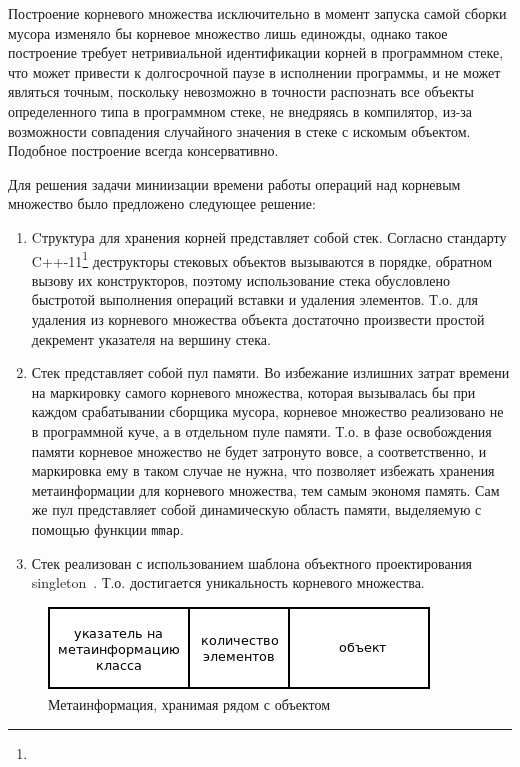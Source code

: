 Построение корневого множества исключительно в момент запуска самой сборки мусора
изменяло бы корневое множество лишь единожды, однако такое построение требует нетривиальной идентификации корней
в программном стеке, что может привести к долгосрочной паузе в исполнении программы, и не может являться
точным, поскольку невозможно в точности распознать все объекты определенного типа в программном стеке, не
внедряясь в компилятор, из-за возможности совпадения случайного значения в стеке с искомым объектом. Подобное
построение всегда консервативно.

Для решения задачи миниизации времени работы операций над корневым множество было предложено следующее решение:
\begin{enumerate}
\item Cтруктура для хранения корней представляет собой стек.
Согласно стандарту C++-11\footnote{} деструкторы стековых объектов вызываются в порядке, обратном вызову
их конструкторов, поэтому использование стека обусловлено быстротой выполнения операций вставки и удаления элементов.
Т.о. для удаления из корневого множества объекта достаточно произвести простой декремент указателя на вершину стека.
\item Стек представляет собой пул памяти.
Во избежание излишних затрат времени на маркировку самого корневого множества, которая вызывалась бы при каждом срабатывании
сборщика мусора, корневое множество реализовано не в программной куче, а в отдельном пуле памяти. Т.о. в фазе освобождения
памяти корневое множество не будет затронуто вовсе, а соответственно, и маркировка ему в таком случае не нужна,
что позволяет избежать хранения метаинформации для корневого множества, тем самым экономя память.
Сам же пул представляет собой динамическую область памяти, выделяемую с помощью функции \lstinline[language= cpp]{mmap}.
\item Стек реализован с использованием шаблона объектного проектирования singleton~\cite{patterns}.
Т.о. достигается уникальность корневого множества.
\end{enumerate} 

\begin{figure}[t]
	\centering
	\includegraphics[width=0.6\linewidth]{Berezun/images/objectMeta.png}
	\caption{Метаинформация, хранимая рядом с объектом}
        \label{metainfo}
\end{figure}

